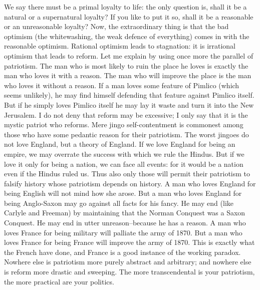 \documentclass{book}
\begin{document}
We say there must be a primal loyalty to life: the only question is, shall it be a natural or a supernatural loyalty? If you like to put it so, shall it be a reasonable or an unreasonable loyalty? Now, the extraordinary thing is that the bad optimism (the whitewashing, the weak defence of everything) comes in with the reasonable optimism. Rational optimism leads to stagnation: it is irrational optimism that leads to reform. Let me explain by using once more the parallel of patriotism. The man who is most likely to ruin the place he loves is exactly the man who loves it with a reason. The man who will improve the place is the man who loves it without a reason. If a man loves some feature of Pimlico (which seems unlikely), he may find himself defending that feature against Pimlico itself. But if he simply loves Pimlico itself he may lay it waste and turn it into the New Jerusalem. I do not deny that reform may be excessive; I only say that it is the mystic patriot who reforms. Mere jingo self-contentment is commonest among those who have some pedantic reason for their patriotism. The worst jingoes do not love England, but a theory of England. If we love England for being an empire, we may overrate the success with which we rule the Hindus. But if we love it only for being a nation, we can face all events: for it would be a nation even if the Hindus ruled us. Thus also only those will permit their patriotism to falsify history whose patriotism depends on history. A man who loves England for being English will not mind how she arose. But a man who loves England for being Anglo-Saxon may go against all facts for his fancy. He may end (like Carlyle and Freeman) by maintaining that the Norman Conquest was a Saxon Conquest. He may end in utter unreason–because he has a reason. A man who loves France for being military will palliate the army of 1870. But a man who loves France for being France will improve the army of 1870. This is exactly what the French have done, and France is a good instance of the working paradox. Nowhere else is patriotism more purely abstract and arbitrary; and nowhere else is reform more drastic and sweeping. The more transcendental is your patriotism, the more practical are your politics.
\end{document}
